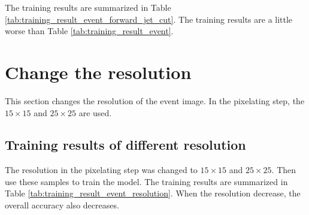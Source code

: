 \documentclass[12pt]{article}
\begin{document}
		The training results are summarized in Table \ref{tab:training_result_event_forward_jet_cut}. The training results are a little worse than Table \ref{tab:training_result_event}.
		\begin{table}[htpb]
			\centering
			\caption{The training results of the full event. The forward jet cuts were applied to the samples.}
			\label{tab:training_result_event_forward_jet_cut}
		\end{table}

\section{Change the resolution}%
\label{sec:change_the_resolution}
	This section changes the resolution of the event image. In the pixelating step, the $15 \times 15$ and $25 \times 25$ are used. 
	\subsection{Training results of different resolution}%
	\label{sub:training_results_of_different_resolution}
		The resolution in the pixelating step was changed to $15 \times 15$ and $25 \times 25$. Then use these samples to train the model. The training results are summarized in Table \ref{tab:training_result_event_resolution}. When the resolution decrease, the overall accuracy also decreases.
\end{document}
